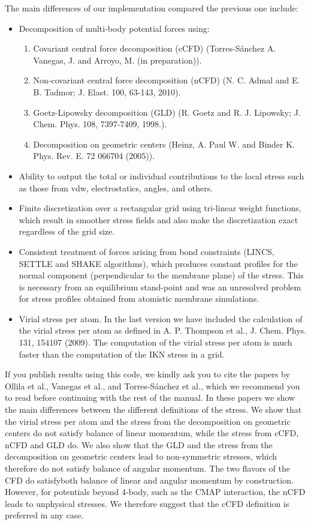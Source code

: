 \documentclass[10pt,letterpaper,notitlepage]{article}
\begin{document}
The main differences of our implementation compared the previous one include:
\begin{itemize}
    \item Decomposition of multi-body potential forces using:
    \begin{enumerate}
	\item Covariant central force decomposition (cCFD) (Torres-S\'anchez A. Vanegas, J. and Arroyo, M. (in preparation)).
    \item Non-covariant central force decomposition (nCFD) (N. C. Admal and E. B. Tadmor; J. Elast. 100, 63-143, 2010).
    \item Goetz-Lipowsky decomposition (GLD) (R. Goetz and R. J. Lipowsky; J. Chem. Phys. 108, 7397-7409, 1998.). 
    \item Decomposition on geometric centers (Heinz, A.  Paul W. and Binder K. Phys. Rev. E. 72 066704 (2005)).
    \end{enumerate}
\item Ability to output the total or individual contributions to the local stress such as those from vdw, electrostatics, angles, and others.
\item Finite discretization over a rectangular grid using tri-linear weight functions, which result in smoother stress fields and also make the discretization exact regardless of the grid size.
\item Consistent treatment of forces arising from bond constraints (LINCS, SETTLE and SHAKE algorithms), which produces constant profiles for the normal component (perpendicular to the membrane plane) of the stress. This is necessary from an equilibrium stand-point and was an unresolved problem for stress profiles obtained from atomistic membrane simulations.
\item Virial stress per atom. In the last version we have included the
calculation of the virial stress per atom as defined in
A. P. Thompson et al., J. Chem. Phys. 131, 154107 (2009). The computation of the virial stress per atom is much faster than the 
computation of the IKN stress in a grid.
\end{itemize}
If you publish results using this code, we kindly ask you to cite the papers by Ollila et al., Vanegas et al., and Torres-S\'anchez et al., which we recommend you to read before continuing with the rest of the manual. In these papers we show the main differences between the different definitions of the stress. We show that the virial stress per atom and the stress from the decomposition on geometric centers do not satisfy balance of linear momentum, while the stress from cCFD, nCFD and GLD do. We also show that the GLD and the stress from the decomposition on geometric centers lead to non-symmetric stresses, which therefore do not satisfy balance of angular momentum. The two flavors of the CFD do satisfyboth balance of linear and angular momentum by construction. However, for potentials beyond 4-body, such as the CMAP interaction, the nCFD leads to unphysical stresses. We therefore suggest that the cCFD definition is preferred in any case.
\end{document}
